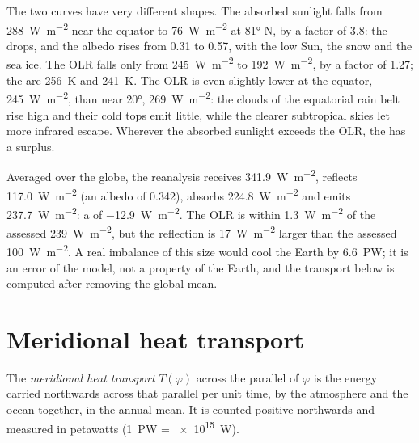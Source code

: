 The two curves have very different shapes. The absorbed sunlight falls from
\qty{288}{W.m^{-2}} near the equator to \qty{76}{W.m^{-2}} at \ang{81} N, by a
factor of \num{3.8}: the  drops, and the albedo rises from \num{0.31} to
\num{0.57}, with the low Sun, the snow and the sea ice. The OLR falls only from
\qty{245}{W.m^{-2}} to \qty{192}{W.m^{-2}}, by a factor of \num{1.27}; the
 are \qty{256}{K} and \qty{241}{K}. The OLR is even slightly
lower at the equator, \qty{245}{W.m^{-2}}, than near \ang{20}, \qty{269}{W.m^{-2}}:
the clouds of the equatorial rain belt rise high and their cold tops emit little,
while the clearer subtropical skies let more infrared escape. Wherever the absorbed sunlight exceeds the OLR, the  has a
surplus.

\begin{example}\label{ex:b1:radiation-heat-transport:global}
Averaged over the globe, the reanalysis receives \qty{341.9}{W.m^{-2}}, reflects
\qty{117.0}{W.m^{-2}} (an albedo of \num{0.342}), absorbs \qty{224.8}{W.m^{-2}} and
emits \qty{237.7}{W.m^{-2}}: a  of \qty{-12.9}{W.m^{-2}}. The OLR is
within \qty{1.3}{W.m^{-2}} of the assessed \qty{239}{W.m^{-2}}, but the reflection
is \qty{17}{W.m^{-2}} larger than the assessed \qty{100}{W.m^{-2}}. A real
imbalance of this size would cool the Earth by \qty{6.6}{PW}; it is an error of
the model, not a property of the Earth, and the transport below is computed after
removing the global mean.
\end{example}

\section{Meridional heat transport}\label{sec:b1:radiation-heat-transport:transport}

\begin{definition}\label{def:b1:radiation-heat-transport:mht}
The \emph{meridional heat transport} $T(\varphi)$
across the parallel of  $\varphi$ is the energy carried northwards across
that parallel per unit time, by the atmosphere and the ocean together, in the annual
mean. It is counted positive northwards and measured in petawatts
(\qty{1}{PW} = \qty{e15}{W}).
\end{definition}

